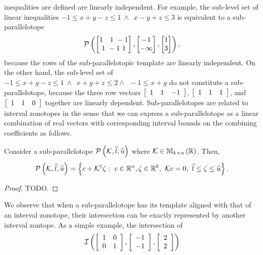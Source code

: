 inequalities are defined are linearly independent. For example, the
sub-level set of linear inequalities $-1\leq x+y-z\leq 1~\wedge~~
x-y+z\leq 3$ is equivalent to a sub-parallelotope
\[
\mathcal{P}\left(\left[\begin{matrix}
    1~~~1~-1\\
    1~-1~1
  \end{matrix}
  \right],\left[
    \begin{matrix}
      -1\\
      -\infty
    \end{matrix}
    \right]
,\left[
    \begin{matrix}
      1\\
      3
    \end{matrix}
    \right]
\right),
\]
because the rows of the sub-parallelotopic template are linearly
independent.  On the other hand, the sub-level set of $-1\leq
x+y-z\leq 1~\wedge~~x+y+z\leq 2\wedge~~-1\leq x+y$ do not constitute a
sub-parallelotope, because the three row vectors $\left[\begin{array}{c
      c c}1 & 1 & -1\end{array}\right]$, $\left[\begin{array}{c c c}1 & 1 &
    1\end{array}\right]$, and $\left[\begin{array}{c c c}1 & 1 &
    0\end{array}\right]$ together are linearly dependent.
Sub-parallelotopes are related to interval zonotopes in the sense that
we can express a sub-parallelotope as a linear combination of real
vectors with corresponding interval bounds on the combining coefficients as
follows.
%
\begin{proposition}
  Consider a sub-parallelotope
  $\mathcal{P}\left(\mathcal{K},\widehat{l},\widehat{u}\right)$ where $\mathcal{K}\in\mathbb{M}_{k\times n}\left(\mathbb{R}\right)$.
  Then,
  \[
  \mathcal{P}\left(\mathcal{K},\widehat{l},\widehat{u}\right)=\left\{c+\mathcal{K}^\dagger\zeta:~c\in\mathbb{R}^n,\zeta\in\mathbb{R}^k,~\mathcal{K}
  c=0,~\widehat{l}\leq
  \zeta\leq \widehat{u}
  \right\}.
  \]
%
\end{proposition}
%
\begin{proof}
{\color{red} TODO}.
\end{proof}
%
We observe that when a sub-parallelotope has its template aligned with
that of an interval zonotope, their intersection can be exactly
represented by another interval zontope.  As a simple example, the
intersection of
%
\[
\mathit{\operatorname{\mathcal{I}}}\left(\left[\begin{array}{l l}1 & 0 \\ 0 &
      1\end{array}\right],\left[\begin{array}{c}-1\\ -1\end{array}\right],\left[\begin{array}{c}2\\ 2\end{array}\right]\right)
\]
